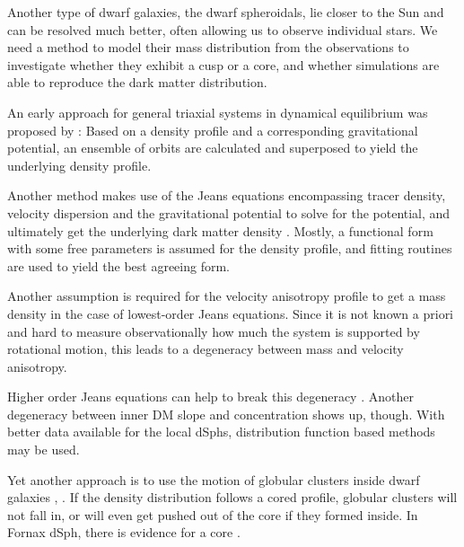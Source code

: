 
Another type of dwarf galaxies, the dwarf spheroidals, lie closer to
the Sun and can be resolved much better, often allowing us to observe
individual stars. We need a method to model their mass distribution
from the observations to investigate whether they exhibit a cusp or
a core, and whether simulations are able to reproduce the dark matter
distribution.



An early approach for general triaxial systems in dynamical
equilibrium was proposed by \citet{Schwarzschild1979}: Based on a
density profile and a corresponding gravitational potential, an
ensemble of orbits are calculated and superposed to yield the
underlying density profile.


Another method makes use of the Jeans equations encompassing tracer
density, velocity dispersion and the gravitational potential to solve
for the potential, and ultimately get the underlying dark matter
density . Mostly, a functional form with
some free parameters is assumed for the density profile, and fitting
routines are used to yield the best agreeing form.


Another assumption is required for the velocity anisotropy profile to
get a mass density in the case of lowest-order Jeans equations. Since
it is not known a priori and hard to measure observationally how much
the system is supported by rotational motion, this leads to a
degeneracy between mass and velocity anisotropy.


Higher order Jeans equations can help to break this degeneracy
. Another degeneracy between inner DM slope and
concentration shows up, though. With better data available for the
local dSphs, distribution function based methods may be used.



Yet another approach is to use the motion of globular clusters inside
dwarf galaxies , . If the density
distribution follows a cored profile, globular clusters will not fall
in, or will even get pushed out of the core if they formed inside. In
Fornax dSph, there is evidence for a core .


